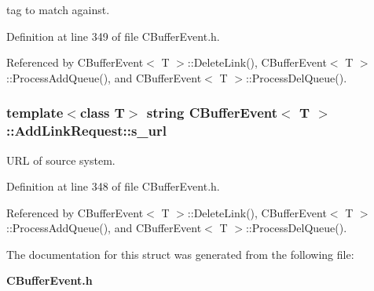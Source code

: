 tag to match against.



Definition at line 349 of file CBuffer\-Event.h.

Referenced by CBuffer\-Event$<$ T $>$::Delete\-Link(), CBuffer\-Event$<$ T $>$::Process\-Add\-Queue(), and CBuffer\-Event$<$ T $>$::Process\-Del\-Queue().
\subsubsection{\setlength{\rightskip}{0pt plus 5cm}template$<$class T$>$ string {\bf CBuffer\-Event}$<$ T $>$::Add\-Link\-Request::s\_\-url}\label{structCBufferEvent_1_1AddLinkRequest_m0}


URL of source system.



Definition at line 348 of file CBuffer\-Event.h.

Referenced by CBuffer\-Event$<$ T $>$::Delete\-Link(), CBuffer\-Event$<$ T $>$::Process\-Add\-Queue(), and CBuffer\-Event$<$ T $>$::Process\-Del\-Queue().

The documentation for this struct was generated from the following file:\begin{CompactItemize}
\item 
{\bf CBuffer\-Event.h}\end{CompactItemize}
